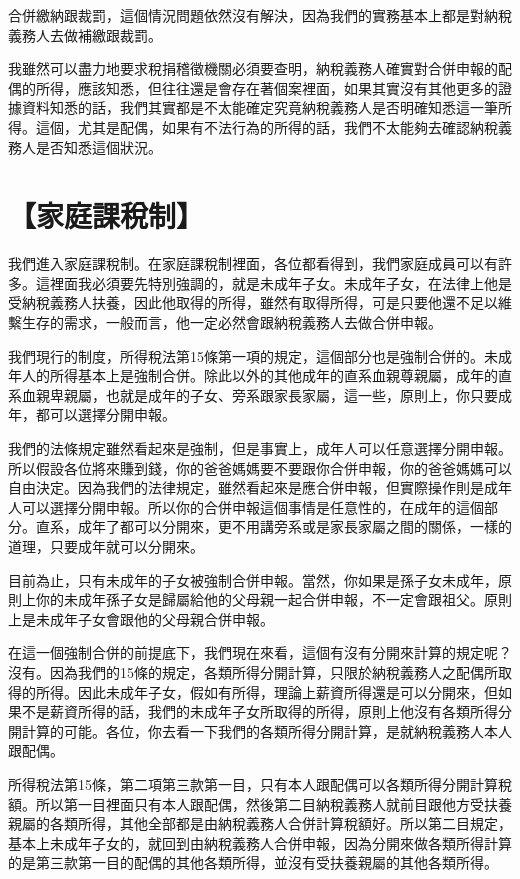 \documentclass[]{ctexbook}
\begin{document}
合併繳納跟裁罰，這個情況問題依然沒有解決，因為我們的實務基本上都是對納稅義務人去做補繳跟裁罰。

我雖然可以盡力地要求稅捐稽徵機關必須要查明，納稅義務人確實對合併申報的配偶的所得，應該知悉，但往往還是會存在著個案裡面，如果其實沒有其他更多的證據資料知悉的話，我們其實都是不太能確定究竟納稅義務人是否明確知悉這一筆所得。這個，尤其是配偶，如果有不法行為的所得的話，我們不太能夠去確認納稅義務人是否知悉這個狀況。

\hypertarget{ux5bb6ux5eadux8ab2ux7a05ux5236}{%
\section{【家庭課稅制】}\label{ux5bb6ux5eadux8ab2ux7a05ux5236}}

我們進入家庭課稅制。在家庭課稅制裡面，各位都看得到，我們家庭成員可以有許多。這裡面我必須要先特別強調的，就是未成年子女。未成年子女，在法律上他是受納稅義務人扶養，因此他取得的所得，雖然有取得所得，可是只要他還不足以維繫生存的需求，一般而言，他一定必然會跟納稅義務人去做合併申報。

我們現行的制度，所得稅法第15條第一項的規定，這個部分也是強制合併的。未成年人的所得基本上是強制合併。除此以外的其他成年的直系血親尊親屬，成年的直系血親卑親屬，也就是成年的子女、旁系跟家長家屬，這一些，原則上，你只要成年，都可以選擇分開申報。

我們的法條規定雖然看起來是強制，但是事實上，成年人可以任意選擇分開申報。所以假設各位將來賺到錢，你的爸爸媽媽要不要跟你合併申報，你的爸爸媽媽可以自由決定。因為我們的法律規定，雖然看起來是應合併申報，但實際操作則是成年人可以選擇分開申報。所以你的合併申報這個事情是任意性的，在成年的這個部分。直系，成年了都可以分開來，更不用講旁系或是家長家屬之間的關係，一樣的道理，只要成年就可以分開來。

目前為止，只有未成年的子女被強制合併申報。當然，你如果是孫子女未成年，原則上你的未成年孫子女是歸屬給他的父母親一起合併申報，不一定會跟祖父。原則上是未成年子女會跟他的父母親合併申報。

在這一個強制合併的前提底下，我們現在來看，這個有沒有分開來計算的規定呢？沒有。因為我們的15條的規定，各類所得分開計算，只限於納稅義務人之配偶所取得的所得。因此未成年子女，假如有所得，理論上薪資所得還是可以分開來，但如果不是薪資所得的話，我們的未成年子女所取得的所得，原則上他沒有各類所得分開計算的可能。各位，你去看一下我們的各類所得分開計算，是就納稅義務人本人跟配偶。

所得稅法第15條，第二項第三款第一目，只有本人跟配偶可以各類所得分開計算稅額。所以第一目裡面只有本人跟配偶，然後第二目納稅義務人就前目跟他方受扶養親屬的各類所得，其他全部都是由納稅義務人合併計算稅額好。所以第二目規定，基本上未成年子女的，就回到由納稅義務人合併申報，因為分開來做各類所得計算的是第三款第一目的配偶的其他各類所得，並沒有受扶養親屬的其他各類所得。
\end{document}
